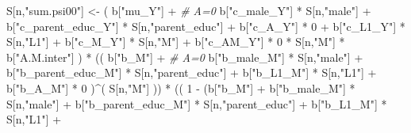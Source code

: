 \documentclass[
]{book}
\newenvironment{Shaded}{\begin{snugshade}}{\end{snugshade}}
\newcommand{\CommentTok}[1]{\textcolor[rgb]{0.56,0.35,0.01}{\textit{#1}}}
\newcommand{\DecValTok}[1]{\textcolor[rgb]{0.00,0.00,0.81}{#1}}
\newcommand{\NormalTok}[1]{#1}
\newcommand{\OtherTok}[1]{\textcolor[rgb]{0.56,0.35,0.01}{#1}}
\newcommand{\SpecialCharTok}[1]{\textcolor[rgb]{0.00,0.00,0.00}{#1}}
\newcommand{\StringTok}[1]{\textcolor[rgb]{0.31,0.60,0.02}{#1}}
\begin{document}
\begin{Shaded}
\begin{Highlighting}[]
\NormalTok{    S[n,}\StringTok{"sum.psi00"}\NormalTok{] }\OtherTok{\textless{}{-}}\NormalTok{  ( b[}\StringTok{"mu\_Y"}\NormalTok{] }\SpecialCharTok{+}                                          \CommentTok{\# A=0}
\NormalTok{                             b[}\StringTok{"c\_male\_Y"}\NormalTok{] }\SpecialCharTok{*}\NormalTok{ S[n,}\StringTok{"male"}\NormalTok{] }\SpecialCharTok{+} 
\NormalTok{                             b[}\StringTok{"c\_parent\_educ\_Y"}\NormalTok{] }\SpecialCharTok{*}\NormalTok{ S[n,}\StringTok{"parent\_educ"}\NormalTok{] }\SpecialCharTok{+} 
\NormalTok{                             b[}\StringTok{"c\_A\_Y"}\NormalTok{] }\SpecialCharTok{*} \DecValTok{0} \SpecialCharTok{+} 
\NormalTok{                             b[}\StringTok{"c\_L1\_Y"}\NormalTok{] }\SpecialCharTok{*}\NormalTok{ S[n,}\StringTok{"L1"}\NormalTok{] }\SpecialCharTok{+}
\NormalTok{                             b[}\StringTok{"c\_M\_Y"}\NormalTok{] }\SpecialCharTok{*}\NormalTok{ S[n,}\StringTok{"M"}\NormalTok{] }\SpecialCharTok{+}
\NormalTok{                             b[}\StringTok{"c\_AM\_Y"}\NormalTok{] }\SpecialCharTok{*} \DecValTok{0} \SpecialCharTok{*}\NormalTok{ S[n,}\StringTok{"M"}\NormalTok{] }\SpecialCharTok{*}\NormalTok{ b[}\StringTok{"A.M.inter"}\NormalTok{] ) }\SpecialCharTok{*}
\NormalTok{      (( b[}\StringTok{"b\_M"}\NormalTok{] }\SpecialCharTok{+}                                                             \CommentTok{\# A\textquotesingle{}=0}
\NormalTok{           b[}\StringTok{"b\_male\_M"}\NormalTok{] }\SpecialCharTok{*}\NormalTok{ S[n,}\StringTok{"male"}\NormalTok{] }\SpecialCharTok{+} 
\NormalTok{           b[}\StringTok{"b\_parent\_educ\_M"}\NormalTok{] }\SpecialCharTok{*}\NormalTok{ S[n,}\StringTok{"parent\_educ"}\NormalTok{] }\SpecialCharTok{+} 
\NormalTok{           b[}\StringTok{"b\_L1\_M"}\NormalTok{] }\SpecialCharTok{*}\NormalTok{ S[n,}\StringTok{"L1"}\NormalTok{] }\SpecialCharTok{+}
\NormalTok{           b[}\StringTok{"b\_A\_M"}\NormalTok{] }\SpecialCharTok{*} \DecValTok{0}\NormalTok{ )}\SpecialCharTok{\^{}}\NormalTok{( S[n,}\StringTok{"M"}\NormalTok{] )) }\SpecialCharTok{*}
\NormalTok{      (( }\DecValTok{1} \SpecialCharTok{{-}}\NormalTok{ (b[}\StringTok{"b\_M"}\NormalTok{] }\SpecialCharTok{+} 
\NormalTok{                b[}\StringTok{"b\_male\_M"}\NormalTok{] }\SpecialCharTok{*}\NormalTok{ S[n,}\StringTok{"male"}\NormalTok{] }\SpecialCharTok{+} 
\NormalTok{                b[}\StringTok{"b\_parent\_educ\_M"}\NormalTok{] }\SpecialCharTok{*}\NormalTok{ S[n,}\StringTok{"parent\_educ"}\NormalTok{] }\SpecialCharTok{+} 
\NormalTok{                b[}\StringTok{"b\_L1\_M"}\NormalTok{] }\SpecialCharTok{*}\NormalTok{ S[n,}\StringTok{"L1"}\NormalTok{] }\SpecialCharTok{+}

\end{Highlighting}
\end{Shaded}
\end{document}
